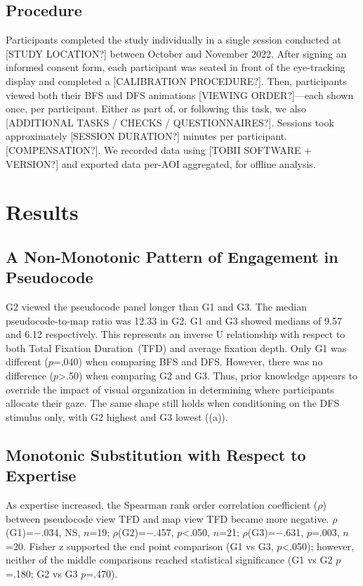 \documentclass[journal]{vgtc}
\begin{document}
\subsection{Procedure}

Participants completed the study individually in a single session
conducted at [STUDY LOCATION?] between October and November 2022.
After signing an informed consent form, each participant was seated
in front of the eye-tracking display and completed a
[CALIBRATION PROCEDURE?]. Then, participants viewed both their BFS
and DFS animations [VIEWING ORDER?]---each shown once, per
participant. Either as part of, or following this task, we also
[ADDITIONAL TASKS / CHECKS / QUESTIONNAIRES?]. Sessions took
approximately [SESSION DURATION?] minutes per participant.
[COMPENSATION?]. We recorded data using
[TOBII SOFTWARE + VERSION?] and
exported data per-AOI aggregated, for offline analysis.


\section{Results}

\subsection{A Non-Monotonic Pattern of Engagement in Pseudocode}
\label{sec:inverted}

G2 viewed the pseudocode panel longer than G1 and G3. The median
pseudocode-to-map ratio was 12.33 in G2. G1 and G3 showed medians of
9.57 and 6.12 respectively. This represents an inverse U relationship
with respect to both Total Fixation Duration~(TFD) and average
fixation depth. Only G1 was different ($p$=.040) when comparing BFS
and DFS. However, there was no difference ($p$>.50) when comparing
G2 and G3. Thus, prior knowledge appears to override the impact of
visual organization in determining where participants allocate their
gaze. The same shape still holds when conditioning on the DFS
stimulus only, with G2 highest and G3 lowest
((a)).

\subsection{Monotonic Substitution with Respect to Expertise}
\label{sec:reversal}

As expertise increased, the Spearman rank order correlation
coefficient ($\rho$) between pseudocode view TFD and map view TFD
became more negative. $\rho$(G1)=$-$.034, NS, $n$=19;
$\rho$(G2)=$-$.457, $p$<.050, $n$=21; $\rho$(G3)=$-$.631, $p$=.003,
$n$=20. Fisher z supported the end point comparison (G1 vs G3,
$p$<.050); however, neither of the middle comparisons reached
statistical significance (G1 vs G2 $p$=.180; G2 vs G3 $p$=.470).
\end{document}
